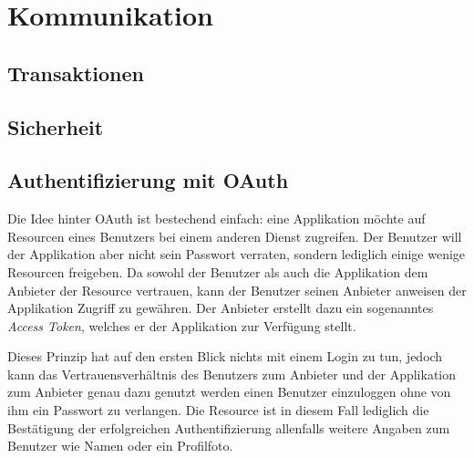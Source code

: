 \section{Kommunikation}

\subsection{Transaktionen}

\subsection{Sicherheit}

\subsection{Authentifizierung mit OAuth}
\label{oauth}

Die Idee hinter \gls{OAuth} ist bestechend einfach: eine Applikation möchte auf Resourcen eines Benutzers bei einem anderen Dienst zugreifen.
Der Benutzer will der Applikation aber nicht sein Passwort verraten, sondern lediglich einige wenige Resourcen freigeben.
Da sowohl der Benutzer als auch die Applikation dem Anbieter der Resource vertrauen, kann der Benutzer seinen Anbieter anweisen der Applikation Zugriff zu gewähren.
Der Anbieter erstellt dazu ein sogenanntes \emph{Access Token}, welches er der Applikation zur Verfügung stellt.

Dieses Prinzip hat auf den ersten Blick nichts mit einem Login zu tun, jedoch kann das Vertrauensverhältnis des Benutzers zum Anbieter und der Applikation zum Anbieter genau dazu genutzt werden einen Benutzer einzuloggen ohne von ihm ein Passwort zu verlangen. 
Die Resource ist in diesem Fall lediglich die Bestätigung der erfolgreichen Authentifizierung allenfalls weitere Angaben zum Benutzer wie Namen oder ein Profilfoto.

